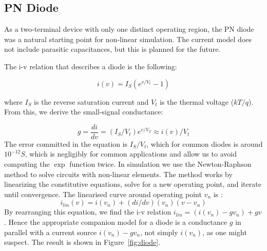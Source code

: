 \documentclass{article}
\begin{document}
\subsection{PN Diode}

As a two-terminal device with only one distinct operating region, the PN diode was a natural starting point for non-linear simulation.  The current model does not include parasitic capacitances, but this is planned for the future.

The i-v relation that describes a diode is the following:

\begin{equation}
i(v) = I_S(e^{v/V_t}-1)
\end{equation}

where $I_S$ is the reverse saturation current and $V_t$ is the thermal voltage ($kT/q$).  From this, we derive the small-signal conductance:

\begin{equation}
g = \frac{di}{dv} = (I_S/V_t) e^{v/V_T} \approx i(v)/V_t
\end{equation}
The error committed in the equation is $I_S / V_t$, which for common diodes is around $10^{-12} S$, which is negligibly for common applications and allow us to avoid computing the $\exp$ function twice.
In simulation we use the Newton-Raphson method to solve circuits with non-linear elements. The method works by linearizing the constitutive equations, solve for a new operating point, and iterate until convergence. The linearised curve around operating point $v_n$ is :
\begin{equation}
i_{lin}(v) = i(v_n) + (di/dv)(v_n) (v - v_n)
\end{equation}
By rearranging this equation, we find the i-v relation $i_{lin}=(i(v_n)-gv_n)+gv$.  Hence the appropriate companion model for a diode is a conductance $g$ in parallel with a current source $i(v_n)-gv_n$, not simply $i(v_n)$, as one might suspect.  The result is shown in Figure~\ref{fig:diode}.
\end{document}
